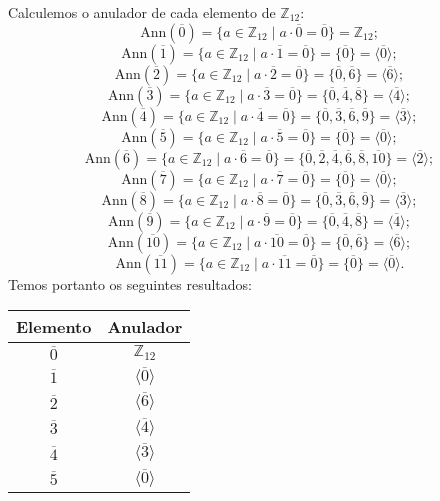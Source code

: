 \documentclass[11pt,a4paper]{article}
\begin{document}
{\medskip
\noindent
Calculemos o anulador de cada elemento de $\mathbb{Z}_{12}:$
\[
\mbox{Ann}(\overline{0}) = \{a \in \mathbb{Z}_{12} \mid  a \cdot \overline{0} = \overline{0} \} = \mathbb{Z}_{12};
\]
\[
\mbox{Ann}(\overline{1}) = \{a \in \mathbb{Z}_{12} \mid  a \cdot \overline{1} = \overline{0} \} = \{ \overline{0} \} = \langle \overline{0} \rangle;
\]
\[
\mbox{Ann}(\overline{2}) = \{a \in \mathbb{Z}_{12} \mid  a \cdot \overline{2} = \overline{0} \} = \{ \overline{0}, \overline{6} \} = \langle \overline{6} \rangle;
\]
\[
\mbox{Ann}(\overline{3}) = \{a \in \mathbb{Z}_{12} \mid  a \cdot \overline{3} = \overline{0} \} = \{ \overline{0}, \overline{4}, \overline{8} \} = \langle \overline{4} \rangle;
\]
\[
\mbox{Ann}(\overline{4}) = \{a \in \mathbb{Z}_{12} \mid  a \cdot \overline{4} = \overline{0} \} = \{ \overline{0}, \overline{3}, \overline{6}, \overline{9} \} = \langle \overline{3} \rangle;
\]
\[
\mbox{Ann}(\overline{5}) = \{a \in \mathbb{Z}_{12} \mid  a \cdot \overline{5} = \overline{0} \} = \{ \overline{0} \} = \langle \overline{0} \rangle;
\]
\[
\mbox{Ann}(\overline{6}) = \{a \in \mathbb{Z}_{12} \mid  a \cdot \overline{6} = \overline{0} \} = \{ \overline{0}, \overline{2}, \overline{4}, \overline{6}, \overline{8}, \overline{10} \} = \langle \overline{2} \rangle;
\]
\[
\mbox{Ann}(\overline{7}) = \{a \in \mathbb{Z}_{12} \mid  a \cdot \overline{7} = \overline{0} \} = \{ \overline{0} \} = \langle \overline{0} \rangle;
\]
\[
\mbox{Ann}(\overline{8}) = \{a \in \mathbb{Z}_{12} \mid  a \cdot \overline{8} = \overline{0} \} = \{ \overline{0}, \overline{3}, \overline{6}, \overline{9}\} = \langle \overline{3} \rangle;
\]
\[
\mbox{Ann}(\overline{9}) = \{a \in \mathbb{Z}_{12} \mid a \cdot \overline{9} = \overline{0} \} = \{ \overline{0}, \overline{4}, \overline{8}\} = \langle \overline{4} \rangle;
\]
\[
\mbox{Ann}(\overline{10}) = \{a \in \mathbb{Z}_{12} \mid  a \cdot \overline{10} = \overline{0} \} = \{ \overline{0}, \overline{6}\} = \langle \overline{6} \rangle;
\]
\[
\mbox{Ann}(\overline{11}) = \{a \in \mathbb{Z}_{12} \mid  a \cdot \overline{11} = \overline{0} \} = \{ \overline{0} \} = \langle \overline{0} \rangle.
\]
Temos portanto os seguintes resultados:
\newline\textcolor{white}{Oi}\newline
\begin{minipage}{.5\textwidth}
\centering
\begin{tabular}{|c|c|}
\toprule
Elemento & Anulador \\ \hline
$\overline{0}$ & $\mathbb{Z}_{12}$ \\\hline
$\overline{1}$ & $\langle \overline{0} \rangle$ \\\hline
$\overline{2}$ & $\langle \overline{6} \rangle$ \\\hline
$\overline{3}$ & $\langle \overline{4} \rangle$ \\\hline
$\overline{4}$ & $\langle \overline{3} \rangle$ \\\hline
$\overline{5}$ & $\langle \overline{0} \rangle$ \\ \hline
\end{tabular}
  

\end{minipage}}
\end{document}
